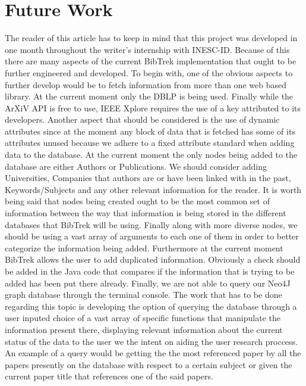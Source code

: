 \documentclass{article}
\begin{document}
\section{Future Work}
The reader of this article has to keep in mind that this project was developed in one month throughout the writer's internship with INESC-ID. Because of this there are many aspects of the current BibTrek implementation that ought to be further engineered and developed. To begin with, one of the obvious aspects to further develop would be to fetch information from more than one web based library. At the current moment only the DBLP is being used. Finally while the ArXiV API is free to use, IEEE Xplore requires the use of a key attributed to its developers. Another aspect that should be considered is the use of dynamic attributes since at the moment any block of data that is fetched has some of its attributes unused because we adhere to a fixed attribute standard when adding data to the database. At the current moment the only nodes being added to the database are either Authors or Publications. We should consider adding Universities, Companies that authors are or have been linked with in the past, Keywords/Subjects and any other relevant information for the reader. It is worth being said that nodes being created ought to be the most common set of information between the way that information is being stored in the different databases that BibTrek will be using. Finally along with more diverse nodes, we should be using a vast array of arguments to each one of them in order to better categorize the information being added. Furthermore at the current moment BibTrek allows the user to add duplicated information. Obviously a check should be added in the Java code that compares if the information that is trying to be added has been put there already. Finally, we are not able to query our Neo4J graph database through the terminal console. The work that has to be done regarding this topic is developing the option of querying the database through a user inputed choice of a vast array of specific functions that manipulate the information present there, displaying relevant information about the current status of the data to the user we the intent on aiding the user research proccess. An example of a query would be getting the the most referenced paper by all the papers presently on the database with respect to a certain subject or given the current paper title that references one of the said papers. 
\end{document}
